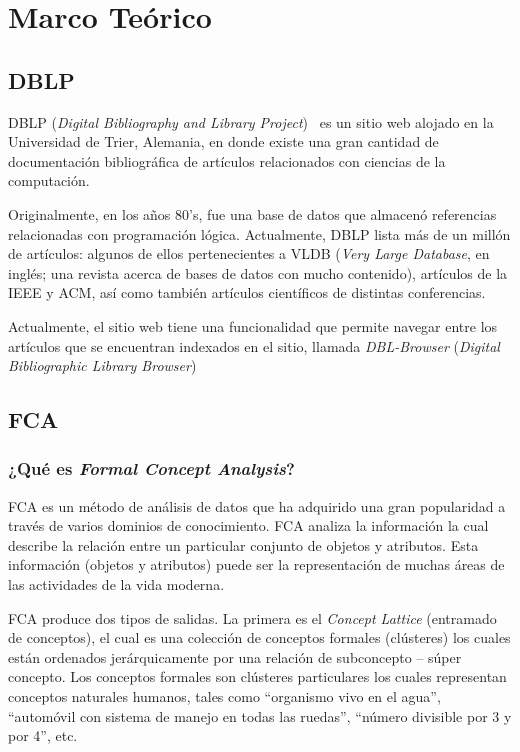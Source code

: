 \documentclass[12pt,oneside,letterpaper]{book}
\newcommand{\eng}[1]{\textit{#1}\xspace}			%
\newcommand{\abr}[1]{\textsc{#1}\xspace}           %
\theoremstyle{definition}
\begin{document}
\chapter{Marco Teórico}
\label{chap:marco_teorico}
\section{\abr{DBLP}}
\label{sec:dblp}
\abr{DBLP} (\eng{Digital Bibliography and Library Project})~\cite{DBLPLey2002} es un sitio web alojado en la Universidad de Trier, Alemania, en donde existe una gran cantidad de documentación bibliográfica de artículos relacionados con ciencias de la computación.

Originalmente, en los años 80's, fue una base de datos que almacenó referencias relacionadas con programación lógica. Actualmente, DBLP lista más de un millón de artículos: algunos de ellos pertenecientes a \abr{VLDB} (\eng{Very Large Database}, en inglés; una revista acerca de bases de datos con mucho contenido), artículos de la \abr{IEEE} y \abr{ACM}, así como también artículos científicos de distintas conferencias.

Actualmente, el sitio web tiene una funcionalidad que permite navegar entre los artículos que se encuentran indexados en el sitio, llamada \eng{DBL-Browser} (\eng{Digital Bibliographic Library Browser}) 

\section{FCA}
\label{sec:fca}
\subsection{¿Qué es \eng{Formal Concept Analysis}?}
\label{sub:que_es_formal_concept_analysis}
\abr{FCA} es un método de análisis de datos que ha adquirido una gran popularidad a través de varios dominios de conocimiento.  \abr{FCA} analiza la información la cual describe la relación entre un particular conjunto de objetos y atributos. Esta información (objetos y atributos) puede ser la representación de muchas áreas de las actividades de la vida moderna.

\abr{FCA} produce dos tipos de salidas. La primera es el \eng{Concept Lattice} (entramado de conceptos), el cual es una colección de conceptos formales (clústeres) los cuales están ordenados jerárquicamente por una relación de subconcepto – súper concepto. Los conceptos formales son clústeres particulares los cuales representan conceptos naturales humanos, tales como ``organismo vivo en el agua'',  ``automóvil con sistema de manejo en todas las ruedas'', ``número divisible por 3 y por 4'', etc.
\end{document}
